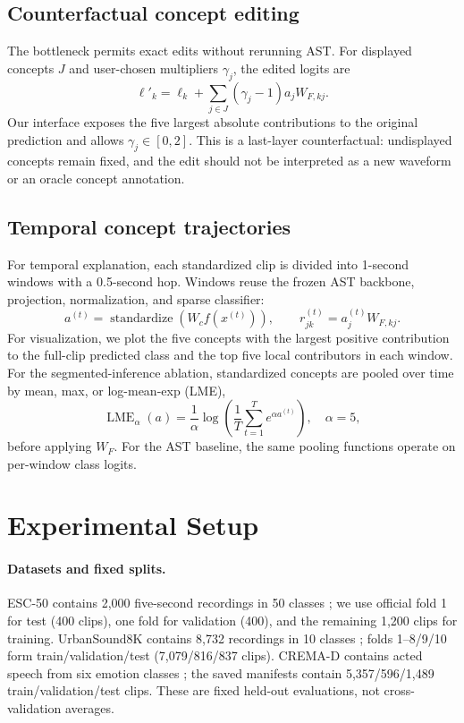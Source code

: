 \documentclass[10pt]{article}
\begin{document}
\subsection{Counterfactual concept editing}
The bottleneck permits exact edits without rerunning AST. For displayed concepts $J$ and user-chosen multipliers $\gamma_j$, the edited logits are
\begin{equation}
\ell'_k=\ell_k+\sum_{j\in J}(\gamma_j-1)a_jW_{F,kj}.
\label{eq:intervention}
\end{equation}
Our interface exposes the five largest absolute contributions to the original prediction and allows $\gamma_j\in[0,2]$. This is a last-layer counterfactual: undisplayed concepts remain fixed, and the edit should not be interpreted as a new waveform or an oracle concept annotation.

\subsection{Temporal concept trajectories}
For temporal explanation, each standardized clip is divided into 1-second windows with a 0.5-second hop. Windows reuse the frozen AST backbone, projection, normalization, and sparse classifier:
\begin{equation}
a^{(t)}=\operatorname{standardize}\!\left(W_cf(x^{(t)})\right),
\qquad r^{(t)}_{jk}=a^{(t)}_jW_{F,kj}.
\label{eq:temporal}
\end{equation}
For visualization, we plot the five concepts with the largest positive contribution to the full-clip predicted class and the top five local contributors in each window. For the segmented-inference ablation, standardized concepts are pooled over time by mean, max, or log-mean-exp (LME),
\begin{equation}
\operatorname{LME}_{\alpha}(a)=\frac{1}{\alpha}\log\!\left(\frac{1}{T}\sum_{t=1}^{T}e^{\alpha a^{(t)}}\right),\quad \alpha=5,
\end{equation}
before applying $W_F$. For the AST baseline, the same pooling functions operate on per-window class logits.

\section{Experimental Setup}
\label{sec:experiments}
\paragraph{Datasets and fixed splits.}
ESC-50 contains 2,000 five-second recordings in 50 classes \citep{piczak2015esc}; we use official fold 1 for test (400 clips), one fold for validation (400), and the remaining 1,200 clips for training. UrbanSound8K contains 8,732 recordings in 10 classes \citep{salamon2014urbansound}; folds 1--8/9/10 form train/validation/test (7,079/816/837 clips). CREMA-D contains acted speech from six emotion classes \citep{cao2014cremad}; the saved manifests contain 5,357/596/1,489 train/validation/test clips. These are fixed held-out evaluations, not cross-validation averages.
\end{document}
